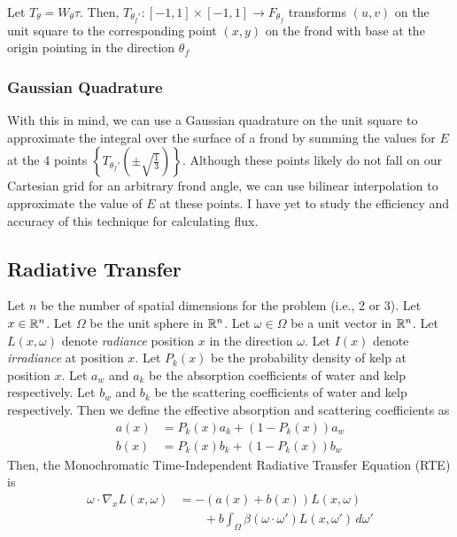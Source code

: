 Let $T_{\theta} = W_{\theta} \tau$.
Then, $T_{\theta_f'}: [-1,1]\times[-1,1] \to F_{\theta_f}$ transforms $(u,v)$ on the unit square to the corresponding point $(x,y)$ on the frond with base at the origin pointing in the direction $\theta_f$

\subsubsection{Gaussian Quadrature}
With this in mind, we can use a Gaussian quadrature on the unit square to approximate the integral over the surface of a frond by summing the values for $E$ at the 4 points $\displaystyle\left\{T_{\theta_f'}\left(\pm\sqrt{\frac{1}{3}}\right)\right\}$. Although these points likely do not fall on our Cartesian grid for an arbitrary frond angle, we can use bilinear interpolation to approximate the value of $E$ at these points.
I have yet to study the efficiency and accuracy of this technique for calculating flux.

\subsection{Radiative Transfer}
Let $n$ be the number of spatial dimensions for the problem (i.e., 2 or 3).
Let $x \in \mathbb{R}^n$.
Let $\Omega$ be the unit sphere in $\mathbb{R}^n$.
Let $\omega \in \Omega$ be a unit vector in $\mathbb{R}^n$.
Let $L(x,\omega)$ denote \textit{radiance} position $x$ in the direction $\omega$.
Let $I(x)$ denote \textit{irradiance} at position $x$.
Let $P_k(x)$ be the probability density of kelp at position $x$.
Let $a_w$ and $a_k$ be the absorption coefficients of water and kelp respectively.
Let $b_w$ and $b_k$ be the scattering coefficients of water and kelp respectively.
Then we define the effective absorption and scattering coefficients as
\begin{align}
	\label{eq:abs}
	a(x) &= P_k(x) a_k + (1-P_k(x)) a_w \\
	\label{eq:sct}
	b(x) &= P_k(x) b_k + (1-P_k(x)) b_w
\end{align}
Then, the Monochromatic Time-Independent Radiative Transfer Equation (RTE) is
\begin{equation}
    \tag{RTE}
    \label{eq:rte}
    \begin{aligned}
        \omega \cdot \nabla_x L(x,\omega) &= -(a(x) + b(x)) L(x,\omega) \\
        &\qquad + b \int_\Omega \beta(\omega \cdot \omega') L(x,\omega')\, d\omega'
    \end{aligned}
\end{equation}

